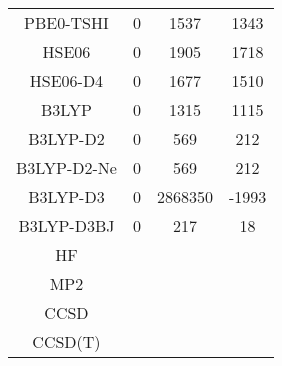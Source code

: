 \begin{table}[ht]
\begin{tabular}{cccc}
PBE0-TSHI & 0 & 1537 & 1343 \\ 
HSE06 & 0 & 1905 & 1718 \\ 
HSE06-D4 & 0 & 1677 & 1510 \\ 
B3LYP & 0 & 1315 & 1115 \\ 
B3LYP-D2 & 0 & 569 & 212 \\ 
B3LYP-D2-Ne & 0 & 569 & 212 \\ 
B3LYP-D3 & 0 & 2868350 & -1993 \\ 
B3LYP-D3BJ & 0 & 217 & 18 \\ 
HF &  \\ 
MP2 &  \\ 
CCSD &  \\ 
CCSD(T) &  \\ 
\hline\hline
\end{tabular}
\end{table}